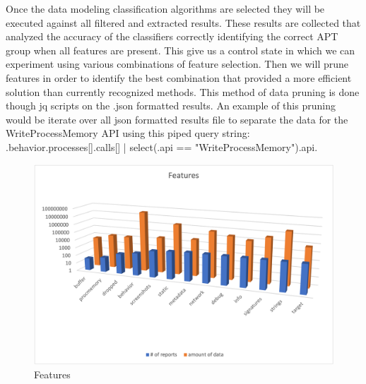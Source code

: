 \documentclass[12pt]{report}
\begin{document}
Once the data modeling classification algorithms are selected they will be executed against all filtered and extracted results.  These results are collected that analyzed the accuracy of the classifiers correctly identifying the correct APT group when all features are present.  This give us a control state in which we can experiment using various combinations of feature selection. Then we will prune features in order to identify the best combination that provided a more efficient solution than currently recognized methods.  This method of data pruning is done though jq scripts on the .json formatted results.  An example of this pruning would be iterate over all json formatted results file to separate the data for the WriteProcessMemory API using this piped query string: .behavior.processes[].calls[] | select(.api == "WriteProcessMemory").api.    

\begin{figure}
	\centering
	\includegraphics[width=1\textwidth]{images/13_features_reports-vs-data.png}
	\caption{Features}
	\label{fig:Features}
\end{figure}
\end{document}

